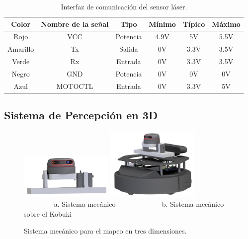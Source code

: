 \begin{table}[htbp]
\begin{center}
\begin{tabular}{|c|c|c|c|c|c|}
	\hline
	Color & Nombre de la se\~nal & Tipo & M\'inimo & T\'ipico & M\'aximo \\ 
	\hline \hline
	Rojo & VCC & Potencia & 4.9V & 5V & 5.5V \\ \hline
	Amarillo & Tx & Salida & 0V & 3.3V & 3.5V \\ \hline
	Verde & Rx & Entrada & 0V & 3.3V & 3.5V \\ \hline
	Negro & GND & Potencia & 0V & 0V & 0V \\ \hline
	Azul & MOTOCTL & Entrada & 0V & 3.3V & 5V \\ \hline
\end{tabular}
	\caption{Interfaz de comunicaci\'on del sensor l\'aser.}
	\label{tbl:comunicacion}
\end{center}
\end{table}


\subsection{Sistema de Percepci\'on en 3D}
\label{sec:SistP3D}
\begin{figure}%
  	\centering \footnotesize
  	\includegraphics[width=0.40\textwidth]{images/lidar_3d.png}
  	\includegraphics[width=0.40\textwidth]{images/lidar_wKbki.png}
  	\\ $\qquad\qquad$ a. Sistema mecánico  $\qquad\qquad\qquad$  b. Sistema mecánico sobre el Kobuki
  	\captionsetup{font=footnotesize}
  	\caption{Sistema mec\'anico para el mapeo en tres dimensiones.}
  	\label{f:lidar3D}
\end{figure}

